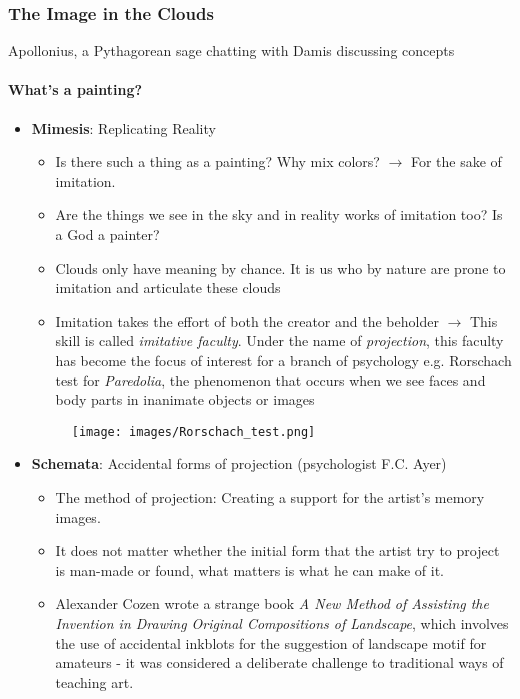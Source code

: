 \documentclass[a4paper]{article}
\begin{document}
\subsubsection{The Image in the Clouds}
Apollonius, a Pythagorean sage chatting with Damis discussing concepts
\paragraph{What's a painting?}
\begin{itemize}
	\item \textbf{Mimesis}: Replicating Reality
	\begin{itemize}
		\item Is there such a thing as a painting? Why mix colors? $\rightarrow$ For the sake of imitation.
		\item Are the things we see in the sky and in reality works of imitation too? Is a God a painter?
		\item Clouds only have meaning by chance.  It is us who by nature are prone to imitation and articulate these clouds
		\item Imitation takes the effort of both the creator and the beholder $\rightarrow$ This skill is called \textit{imitative faculty}. 
		Under the name of \textit{projection}, this faculty has become the focus of interest for a branch of psychology e.g. Rorschach test for
		\textit{Paredolia}, the phenomenon that occurs when we see faces and body parts in inanimate objects or images 
	\end{itemize}
\begin{figure}[H]
	\centering
	\texttt{[image: images/Rorschach\_test.png]}
\end{figure}
	\item \textbf{Schemata}: Accidental forms of projection (psychologist F.C. Ayer)
	\begin{itemize}[label=$\circ$]
		\item The method of projection: Creating a support for the artist’s memory images. 
		\item It does not matter whether the initial form that the artist try to project is man-made or found, what matters is what he can make of it. 
		\item Alexander Cozen wrote a strange book \textit{A New Method of Assisting the Invention in Drawing Original Compositions of Landscape},
		which involves the use of accidental inkblots for the suggestion of landscape motif for amateurs - it was considered a deliberate challenge to traditional ways of teaching art. 

\end{itemize}
\end{itemize}
\end{document}
